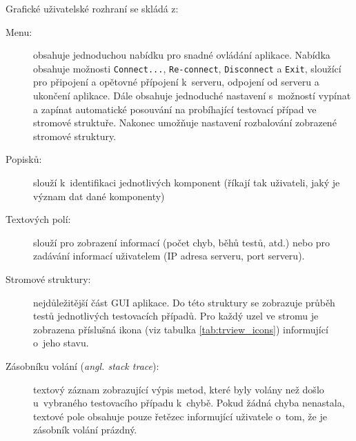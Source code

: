       \noindent Grafické uživatelské rozhraní se skládá z:
      \begin{description}
	 \item[Menu:] obsahuje jednoduchou nabídku pro snadné ovládání aplikace. Nabídka obsahuje možnosti \texttt{Connect...}, \texttt{Re-connect}, \texttt{Disconnect} a \texttt{Exit}, sloužící pro připojení a opětovné přípojení k~serveru, odpojení od serveru a ukončení aplikace. Dále obsahuje jednoduché nastavení s~možností vypínat a zapínat automatické posouvání na probíhající testovací případ ve stromové struktuře. Nakonec umožňuje nastavení rozbalování zobrazené stromové struktury.
	 \item[Popisků:] slouží k~identifikaci jednotlivých komponent (říkají tak uživateli, jaký je význam dat dané komponenty)
	 \item[Textových polí:] slouží pro zobrazení informací (počet chyb, běhů testů, atd.) nebo pro zadávání informací uživatelem (IP adresa serveru, port serveru).
	 \item[Stromové struktury:] nejdůležitější část GUI aplikace. Do této struktury se zobrazuje průběh testů jednotlivých testovacích případů. Pro každý uzel ve stromu je zobrazena příslušná ikona (viz tabulka \ref{tab:trview_icons}) informující o~jeho stavu.
	 \item[Zásobníku volání (\emph{angl. stack trace}):] textový záznam zobrazující výpis metod, které byly volány než došlo u~vybraného testovacího případu k~chybě. Pokud žádná chyba nenastala, textové pole obsahuje pouze řetězec informující uživatele o~tom, že je zásobník volání prázdný.
      \end{description}


